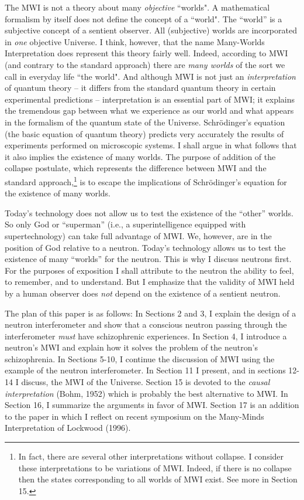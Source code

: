 The MWI is not a theory about many {\it objective} ``worlds".  A
mathematical formalism by itself does not define the concept of a
``world".  The ``world'' is a subjective concept of a sentient
observer.  All (subjective) worlds are incorporated in {\it one}
objective Universe.  I think, however, that the name Many-Worlds
Interpretation does represent this theory fairly well.  Indeed,
according to MWI (and contrary to the standard approach) there are
{\it many worlds} of the sort we call in everyday life ``the world".
And although MWI is not just an {\it interpretation} of quantum theory
-- it differs from the standard quantum theory in certain experimental
predictions -- interpretation is an essential part of MWI; it explains
the tremendous gap between what we experience as our world and what
appears in the formalism of the quantum state of the Universe.
Schr\"odinger's equation (the basic equation of quantum theory)
predicts very accurately the results of experiments performed on
microscopic systems.  I shall argue in what follows that it also
implies the existence of many worlds.  The purpose of addition of the
collapse postulate, which represents the difference between MWI and
the standard approach,\footnote{In fact, there are several other
  interpretations without collapse.  I consider these interpretations
  to be variations of MWI. Indeed, if there is no collapse then the
  states corresponding to all worlds of MWI exist.  See more in
  Section 15.} is to escape the implications of Schr\"odinger's
equation for the existence of many worlds.

Today's technology does not allow us to test the existence of the
``other'' worlds.  So only God or ``superman'' (i.e., a
superintelligence equipped with supertechnology) can take full
advantage of MWI. We, however, are in the position of God relative to
a neutron.  Today's technology allows us to test the existence of many
``worlds'' for the neutron.  This is why I discuss neutrons first.
For the purposes of exposition I shall attribute to the neutron the
ability to feel, to remember, and to understand.  But I emphasize that
the validity of MWI held by a human observer does {\it not} depend on
the existence of a sentient neutron.

The plan of this paper is as follows: In Sections 2 and 3, I explain
the design of a neutron interferometer and show that a conscious
neutron passing through the interferometer {\it must} have
schizophrenic experiences.  In Section 4, I introduce a neutron's MWI
and explain how it solves the problem of the neutron's schizophrenia.
In Sections 5-10, I continue the discussion of MWI using the example
of the neutron interferometer.  In Section 11 I present, and in
sections 12-14 I discuss, the MWI of the Universe. Section 15 is
devoted to the {\it causal interpretation} (Bohm, 1952) which is
probably the best alternative to MWI.  In Section 16, I summarize the
arguments in favor of MWI. Section 17 is an addition to the paper in
which I reflect on recent symposium on the Many-Minds Interpretation
of Lockwood (1996).
 

